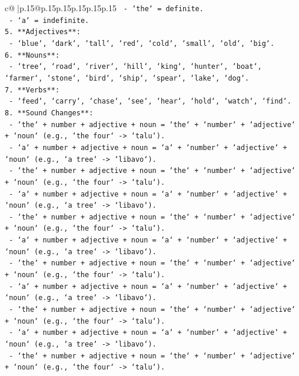 \documentclass{article}
\begin{document}
{\begin{supertabular}{c@{$\;$}|p{.15\linewidth}@{}p{.15\linewidth}p{.15\linewidth}p{.15\linewidth}p{.15\linewidth}p{.15\linewidth}}
{{{\texttt{   {-} `the` = definite.} \\
\texttt{   {-} `a` = indefinite.} \\
\texttt{5. **Adjectives**:} \\
\texttt{   {-} `blue`, `dark`, `tall`, `red`, `cold`, `small`, `old`, `big`.} \\
\texttt{6. **Nouns**:} \\
\texttt{   {-} `tree`, `road`, `river`, `hill`, `king`, `hunter`, `boat`, `farmer`, `stone`, `bird`, `ship`, `spear`, `lake`, `dog`.} \\
\texttt{7. **Verbs**:} \\
\texttt{   {-} `feed`, `carry`, `chase`, `see`, `hear`, `hold`, `watch`, `find`.} \\
\texttt{8. **Sound Changes**:} \\
\texttt{   {-} `the` + number + adjective + noun = `the` + `number` + `adjective` + `noun` (e.g., `the four` {-}> `talu`).} \\
\texttt{   {-} `a` + number + adjective + noun = `a` + `number` + `adjective` + `noun` (e.g., `a tree` {-}> `libavo`).} \\
\texttt{   {-} `the` + number + adjective + noun = `the` + `number` + `adjective` + `noun` (e.g., `the four` {-}> `talu`).} \\
\texttt{   {-} `a` + number + adjective + noun = `a` + `number` + `adjective` + `noun` (e.g., `a tree` {-}> `libavo`).} \\
\texttt{   {-} `the` + number + adjective + noun = `the` + `number` + `adjective` + `noun` (e.g., `the four` {-}> `talu`).} \\
\texttt{   {-} `a` + number + adjective + noun = `a` + `number` + `adjective` + `noun` (e.g., `a tree` {-}> `libavo`).} \\
\texttt{   {-} `the` + number + adjective + noun = `the` + `number` + `adjective` + `noun` (e.g., `the four` {-}> `talu`).} \\
\texttt{   {-} `a` + number + adjective + noun = `a` + `number` + `adjective` + `noun` (e.g., `a tree` {-}> `libavo`).} \\
\texttt{   {-} `the` + number + adjective + noun = `the` + `number` + `adjective` + `noun` (e.g., `the four` {-}> `talu`).} \\
\texttt{   {-} `a` + number + adjective + noun = `a` + `number` + `adjective` + `noun` (e.g., `a tree` {-}> `libavo`).} \\
\texttt{   {-} `the` + number + adjective + noun = `the` + `number` + `adjective` + `noun` (e.g., `the four` {-}> `talu`).} \\
}}}
\end{supertabular}}
\end{document}
